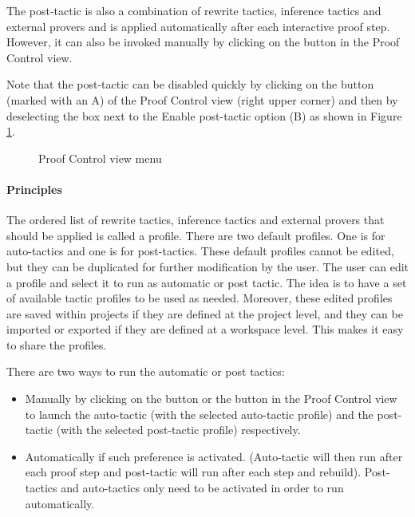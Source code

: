 The post-tactic is also a combination of rewrite tactics, inference tactics and external provers and is applied automatically after each interactive proof step. However, it can also be invoked manually by clicking on the  button in the \textsf{Proof Control} view.

Note that the post-tactic can be disabled quickly by clicking on the  button (marked with an A) of the \textsf{Proof Control} view (right upper corner) and then by deselecting the box next to the \textsf{Enable post-tactic} option (B) as shown in Figure \ref{fig_ref_01_proving_perspective12}. 

\begin{figure}[!ht]
\begin{center}
	\caption{Proof Control view menu}
	\label{fig_ref_01_proving_perspective12}
\end{center}
\end{figure}

\paragraph{Principles}

The ordered list of rewrite tactics, inference tactics and external provers that should be applied is called a profile. There are two default profiles. One is for auto-tactics and one is for post-tactics. These default profiles cannot be edited, but they can be duplicated for further modification by the user. The user can edit a profile and select it to run as automatic or post tactic. The idea is to have a set of available tactic profiles to be used as needed. Moreover, these edited profiles are saved within projects if they are defined at the project level, and they can be imported or exported if they are defined at a workspace level. This makes it easy to share the profiles. 

There are two ways to run the automatic or post tactics:

\begin{itemize}
	\item Manually by clicking on the  button or the  button in the \textsf{Proof Control view} to launch the auto-tactic (with the selected auto-tactic profile) and the post-tactic (with the selected post-tactic profile) respectively.
	\item Automatically if such preference is activated. (Auto-tactic will then run after each proof step and post-tactic will run after each step and rebuild). Post-tactics and auto-tactics only need to be activated in order to run automatically. 
\end{itemize}

